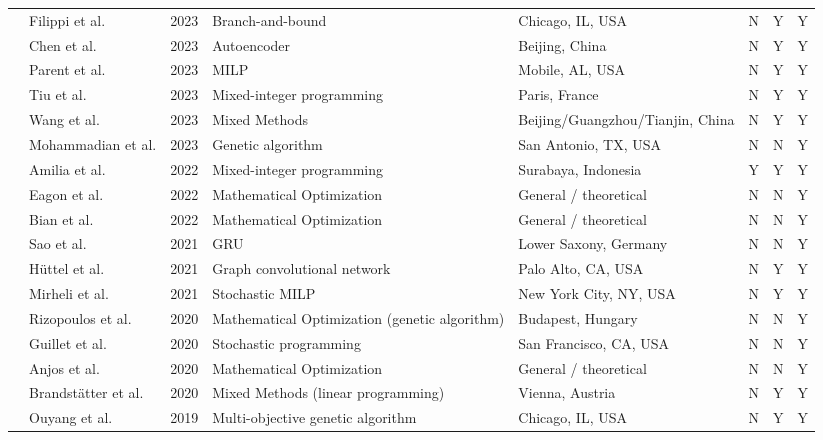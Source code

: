 \documentclass[letterpaper, 12pt, oneside, doublespacing]{Thesis}
\begin{document}
\begin{longtable}{L{0.9cm} L{1.8cm} L{0.7cm} L{2.5cm} L{2.1cm} L{0.7cm} L{0.7cm} L{0.7cm}}
\cite{incorporating_time-dependent_2023} & Filippi et al. & 2023 & Branch-and-bound & Chicago, IL, USA & N & Y & Y \\
\cite{m-bev_masked_2023} & Chen et al. & 2023 & Autoencoder & Beijing, China & N & Y & Y \\
\cite{maximum_flow-based_2023} & Parent et al. & 2023 & MILP & Mobile, AL, USA & N & Y & Y \\
\cite{on_the_2023} & Tiu et al. & 2023 & Mixed-integer programming & Paris, France & N & Y & Y \\
\cite{spap_simultaneous_2023} & Wang et al. & 2023 & Mixed Methods & Beijing{\slash}Guangzhou{\slash}Tianjin, China & N & Y & Y \\
\cite{spatial_arbitrage_2023} & Mohammadian et al. & 2023 & Genetic algorithm & San Antonio, TX, USA & N & N & Y \\
\cite{designing_an_2022} & Amilia et al. & 2022 & Mixed-integer programming & Surabaya, Indonesia & Y & Y & Y \\
\cite{model-based_framework_2022} & Eagon et al. & 2022 & Mathematical Optimization & General {\slash} theoretical & N & N & Y \\
\cite{planning_of_2022} & Bian et al. & 2022 & Mathematical Optimization & General {\slash} theoretical & N & N & Y \\
\cite{deep_information_2021} & Sao et al. & 2021 & GRU & Lower Saxony, Germany & N & N & Y \\
\cite{deep_spatio-temporal_2021} & H\"uttel et al. & 2021 & Graph convolutional network & Palo Alto, CA, USA & N & Y & Y \\
\cite{hierarchical_optimization_2021} & Mirheli et al. & 2021 & Stochastic MILP & New York City, NY, USA & N & Y & Y \\
\cite{a_method_2020} & Rizopoulos et al. & 2020 & Mathematical Optimization (genetic algorithm) & Budapest, Hungary & N & N & Y \\
\cite{electric_vehicle_2020} & Guillet et al. & 2020 & Stochastic programming & San Francisco, CA, USA & N & N & Y \\
\cite{increasing_electric_2020} & Anjos et al. & 2020 & Mathematical Optimization & General {\slash} theoretical & N & N & Y \\
\cite{location_of_2020} & Brandst\"atter et al. & 2020 & Mixed Methods (linear programming) & Vienna, Austria & N & Y & Y \\
\cite{a_method_2019} & Ouyang et al. & 2019 & Multi-objective genetic algorithm & Chicago, IL, USA & N & Y & Y \\

\end{longtable}
\end{document}
